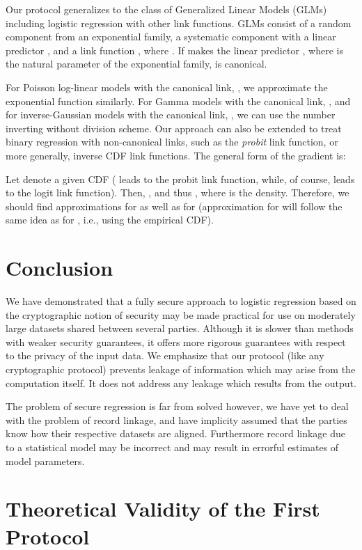 \documentclass[11pt]{article}
\begin{document}
Our protocol generalizes to the class of Generalized Linear Models (GLMs) including logistic regression with other link functions.  GLMs consist of a random component  from an exponential family, a systematic component with a linear predictor , and a link function , where . If  makes the linear predictor , where  is the natural parameter of the exponential family,   is canonical.




For Poisson log-linear models with the canonical link, , we approximate the exponential function similarly. For Gamma models with the canonical link, , and for inverse-Gaussian models with the canonical link, ,  we can use the number inverting without division scheme. Our approach can also be extended to treat binary regression with non-canonical links, such as the \emph{probit} link function, or more generally, inverse CDF link functions. The general form of the gradient is:

Let  denote a given CDF ( leads to the probit link function, while, of course,  leads to the logit link function). Then, , and thus , where  is the density. Therefore, we should find approximations for  as well as for  (approximation for  will follow the same idea as for , i.e., using the empirical CDF).

\section{Conclusion}

We have demonstrated that a fully secure approach to logistic regression based on the cryptographic notion of security may be made practical for use on moderately large datasets shared between several parties.  Although it is slower than methods with weaker security guarantees, it offers more rigorous guarantees with respect to the privacy of the input data.  We emphasize that our protocol (like any cryptographic protocol) prevents leakage of information which may arise from the computation itself.  It does not address any leakage which results from the output.

The problem of secure regression is far from solved however, we have yet to deal with the problem of record linkage, and have implicity assumed that the parties know how their respective datasets are aligned.  Furthermore record linkage due to a statistical model may be incorrect and may result in errorful estimates of model parameters. 


\appendix
\section{Theoretical Validity of the First Protocol}\label{sec:validity_1}
\end{document}
